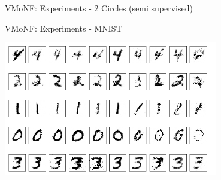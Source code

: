 \documentclass{beamer}
\begin{document}
\begin{frame}{VMoNF: Experiments - 2 Circles (semi supervised)}
\protect\hypertarget{vmonf-experiments---2-circles-semi-supervised}{}

\centering
{}
\hfill
{}

\end{frame}

\begin{frame}{VMoNF: Experiments - MNIST}
\protect\hypertarget{vmonf-experiments---mnist}{}

\centering

\includegraphics[width=0.7\textwidth]{figures/trained_mnist.png}

\end{frame}
\end{document}
